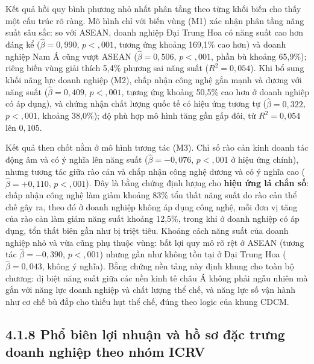 \documentclass[
  a4paper,
  13pt]{extreport}
\begin{document}
Kết quả hồi quy bình phương nhỏ nhất phân tầng theo từng khối biến cho
thấy một cấu trúc rõ ràng. Mô hình chỉ với biến vùng (M1) xác nhận phân
tầng năng suất sâu sắc: so với ASEAN, doanh nghiệp Đại Trung Hoa có năng
suất cao hơn đáng kể (\(\hat{\beta} = 0{,}990\), \(p < {,}001\), tương
ứng khoảng 169,1\% cao hơn) và doanh nghiệp Nam Á cũng vượt ASEAN
(\(\hat{\beta} = 0{,}506\), \(p < {,}001\), phần bù khoảng 65,9\%);
riêng biến vùng giải thích 5,4\% phương sai năng suất
(\(R^2 = 0{,}054\)). Khi bổ sung khối năng lực doanh nghiệp (M2), chấp
nhận công nghệ gắn mạnh và dương với năng suất
(\(\hat{\beta} = 0{,}409\), \(p < {,}001\), tương ứng khoảng 50,5\% cao
hơn ở doanh nghiệp có áp dụng), và chứng nhận chất lượng quốc tế có hiệu
ứng tương tự (\(\hat{\beta} = 0{,}322\), \(p < {,}001\), khoảng 38,0\%);
độ phù hợp mô hình tăng gần gấp đôi, từ \(R^2 = 0{,}054\) lên
\(0{,}105\).

Kết quả then chốt nằm ở mô hình tương tác (M3). Chỉ số rào cản kinh
doanh tác động âm và có ý nghĩa lên năng suất
(\(\hat{\beta} = -0{,}076\), \(p < {,}001\) ở hiệu ứng chính), nhưng
tương tác giữa rào cản và chấp nhận công nghệ dương và có ý nghĩa cao
(\(\hat{\beta} = +0{,}110\), \(p < {,}001\)). Đây là bằng chứng định
lượng cho \textbf{hiệu ứng lá chắn số}: chấp nhận công nghệ làm giảm
khoảng 83\% tổn thất năng suất do rào cản thể chế gây ra, theo đó ở
doanh nghiệp không áp dụng công nghệ, mỗi đơn vị tăng của rào cản làm
giảm năng suất khoảng 12,5\%, trong khi ở doanh nghiệp có áp dụng, tổn
thất biên gần như bị triệt tiêu. Khoảng cách năng suất của doanh nghiệp
nhỏ và vừa cũng phụ thuộc vùng: bất lợi quy mô rõ rệt ở ASEAN (tương tác
\(\hat{\beta} = -0{,}390\), \(p < {,}001\)) nhưng gần như không tồn tại
ở Đại Trung Hoa (\(\hat{\beta} = 0{,}043\), không ý nghĩa). Bằng chứng
nền tảng này định khung cho toàn bộ chương: dị biệt năng suất giữa các
nền kinh tế châu Á không phải ngẫu nhiên mà gắn với năng lực doanh
nghiệp và chất lượng thể chế, và năng lực số vận hành như cơ chế bù đắp
cho thiếu hụt thể chế, đúng theo logic của khung CDCM.

\hypertarget{phux1ed5-biuxean-lux1ee3i-nhuux1eadn-vuxe0-hux1ed3-sux1a1-ux111ux1eb7c-trux1b0ng-doanh-nghiux1ec7p-theo-nhuxf3m-icrv}{%
\subsection{4.1.8 Phổ biên lợi nhuận và hồ sơ đặc trưng doanh nghiệp
theo nhóm
ICRV}\label{phux1ed5-biuxean-lux1ee3i-nhuux1eadn-vuxe0-hux1ed3-sux1a1-ux111ux1eb7c-trux1b0ng-doanh-nghiux1ec7p-theo-nhuxf3m-icrv}}
\end{document}
